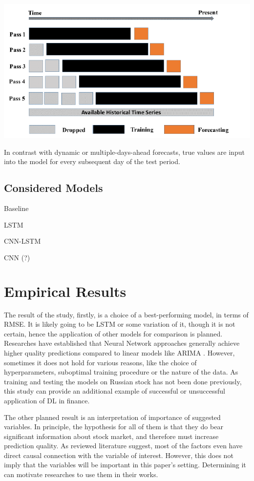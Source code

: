 \documentclass[stu]{apa7}
\begin{document}
\includegraphics[width=\textwidth]{walkforward.png}

In contrast with dynamic or multiple-days-ahead forecasts, true values are input into the model for every subsequent day of the test period.

\subsection{Considered Models}

Baseline

LSTM

CNN-LSTM

CNN (?)

\section{Empirical Results}

The result of the study, firstly, is a choice of a best-performing model, in terms of RMSE. It is likely going to be LSTM or some variation of it, though it is not certain, hence the application of other models for comparison is planned. Researches have established that Neural Network approaches generally achieve higher quality predictions compared to linear models like ARIMA \citep{siami-namini_comparison_2018}. However, sometimes it does not hold for various reasons, like the choice of hyperparameters, suboptimal training procedure or the nature of the data. As training and testing the models on Russian stock has not been done previously, this study can provide an additional example of successful or unsuccessful application of DL in finance.

The other planned result is an interpretation of importance of suggested variables. In principle, the hypothesis for all of them is that they do bear significant information about stock market, and therefore must increase prediction quality. As reviewed literature suggest, most of the factors even have direct causal connection with the variable of interest. However, this does not imply that the variables will be important in this paper's setting. Determining it can motivate researches to use them in their works.
\end{document}
